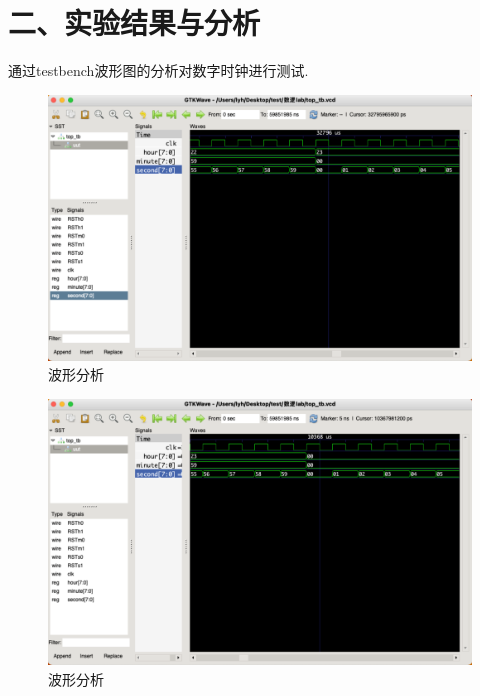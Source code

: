 \documentclass{article}
\begin{document}
\section*{二、实验结果与分析}

通过testbench波形图的分析对数字时钟进行测试.

\begin{figure}[H]
    \centering
    \includegraphics[width=1\textwidth]{4.png}
    \caption{\label{Lab12}波形分析}
    \end{figure}

    
    \begin{figure}[H]
        \centering
        \includegraphics[width=1\textwidth]{5.png}
        \caption{\label{Lab12}波形分析}
        \end{figure}
\end{document}
